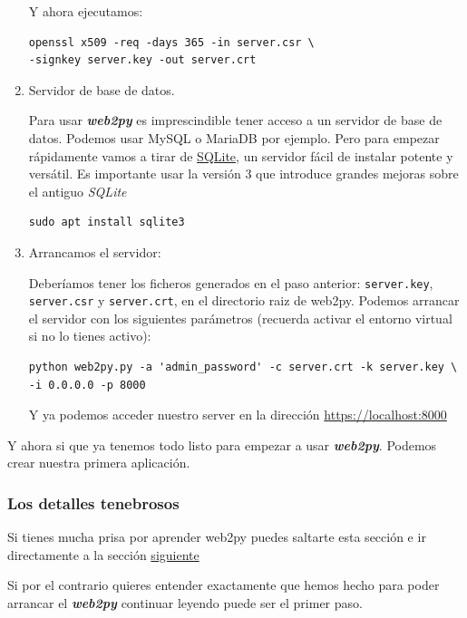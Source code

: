 \documentclass[
  12pt,
  spanish,
]{article}
\begin{document}
\begin{enumerate}
  Y ahora ejecutamos:

\begin{verbatim}
openssl x509 -req -days 365 -in server.csr \
-signkey server.key -out server.crt
\end{verbatim}
\item
  Servidor de base de datos.

  Para usar \textbf{\emph{web2py}} es imprescindible tener acceso a un
  servidor de base de datos. Podemos usar MySQL o MariaDB por ejemplo.
  Pero para empezar rápidamente vamos a tirar de
  \href{https://www.sqlite.org/version3.html}{SQLite}, un servidor fácil
  de instalar potente y versátil. Es importante usar la versión 3 que
  introduce grandes mejoras sobre el antiguo \emph{SQLite}

\begin{verbatim}
sudo apt install sqlite3
\end{verbatim}
\item
  Arrancamos el servidor:

  Deberíamos tener los ficheros generados en el paso anterior:
  \texttt{server.key}, \texttt{server.csr} y \texttt{server.crt}, en el
  directorio raiz de web2py. Podemos arrancar el servidor con los
  siguientes parámetros (recuerda activar el entorno virtual si no lo
  tienes activo):

\begin{verbatim}
python web2py.py -a 'admin_password' -c server.crt -k server.key \
-i 0.0.0.0 -p 8000
\end{verbatim}

  Y ya podemos acceder nuestro server en la dirección
  \url{https://localhost:8000}
\end{enumerate}

Y ahora si que ya tenemos todo listo para empezar a usar
\textbf{\emph{web2py}}. Podemos crear nuestra primera aplicación.

\hypertarget{los-detalles-tenebrosos}{%
\subsubsection{Los detalles tenebrosos}\label{los-detalles-tenebrosos}}

Si tienes mucha prisa por aprender web2py puedes saltarte esta sección e
ir directamente a la sección
\protect\hyperlink{nuestra-primera-aplicaciuxf3n}{siguiente}

Si por el contrario quieres entender exactamente que hemos hecho para
poder arrancar el \textbf{\emph{web2py}} continuar leyendo puede ser el
primer paso.
\end{document}
